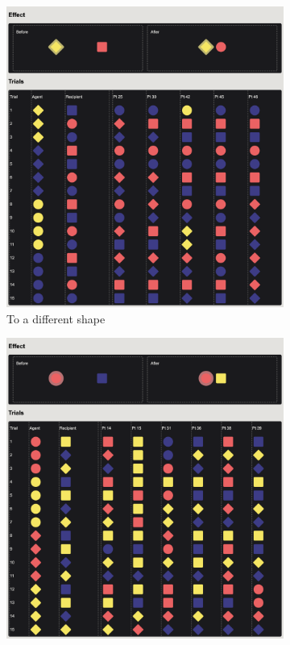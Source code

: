 \documentclass{article}
\begin{document}
\begin{figure}[h!]
  \vspace{1em}
  \begin{subfigure}[t]{0.31\textwidth}
  	\centering
  	\includegraphics[width=\linewidth]{raw_g2} 
  	\caption{To a different shape} \label{fig:raw_g2}
  \end{subfigure}
  \hfill
  \begin{subfigure}[t]{0.31\textwidth}
  	\centering
  	\includegraphics[width=\linewidth]{raw_g4} 

\end{subfigure}
\end{figure}
\end{document}
